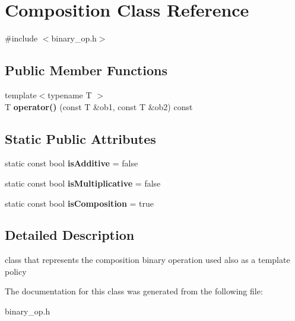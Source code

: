 \hypertarget{classComposition}{
\section{\-Composition \-Class \-Reference}
\label{classComposition}
}


{\ttfamily \#include $<$binary\-\_\-op.\-h$>$}

\subsection*{\-Public \-Member \-Functions}
\begin{DoxyCompactItemize}
\item 
\hypertarget{classComposition_a048fe922128d64e0ac28f59ee3dd6206}{
{\footnotesize template$<$typename T $>$ }\\\-T {\bfseries operator()} (const \-T \&ob1, const \-T \&ob2) const }
\label{classComposition_a048fe922128d64e0ac28f59ee3dd6206}

\end{DoxyCompactItemize}
\subsection*{\-Static \-Public \-Attributes}
\begin{DoxyCompactItemize}
\item 
\hypertarget{classComposition_a3a184cd6b55d3e5cf4f86868d3350c89}{
static const bool {\bfseries is\-Additive} = false}
\label{classComposition_a3a184cd6b55d3e5cf4f86868d3350c89}

\item 
\hypertarget{classComposition_a4092be14bb95792e50a3670e46455b58}{
static const bool {\bfseries is\-Multiplicative} = false}
\label{classComposition_a4092be14bb95792e50a3670e46455b58}

\item 
\hypertarget{classComposition_ad088137e0a459dadd3a3c5b89ecdf1d1}{
static const bool {\bfseries is\-Composition} = true}
\label{classComposition_ad088137e0a459dadd3a3c5b89ecdf1d1}

\end{DoxyCompactItemize}


\subsection{\-Detailed \-Description}
class that represents the composition binary operation used also as a template policy 

\-The documentation for this class was generated from the following file\-:\begin{DoxyCompactItemize}
\item 
binary\-\_\-op.\-h\end{DoxyCompactItemize}

